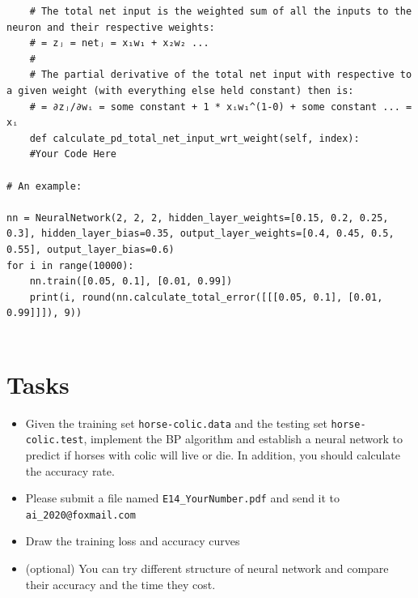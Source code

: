 \documentclass[a4paper, 11pt]{article}
\begin{document}
\begin{enumerate}
\begin{lstlisting}
    # The total net input is the weighted sum of all the inputs to the neuron and their respective weights:
    # = zⱼ = netⱼ = x₁w₁ + x₂w₂ ...
    #
    # The partial derivative of the total net input with respective to a given weight (with everything else held constant) then is:
    # = ∂zⱼ/∂wᵢ = some constant + 1 * xᵢw₁^(1-0) + some constant ... = xᵢ
    def calculate_pd_total_net_input_wrt_weight(self, index):
    #Your Code Here

# An example:

nn = NeuralNetwork(2, 2, 2, hidden_layer_weights=[0.15, 0.2, 0.25, 0.3], hidden_layer_bias=0.35, output_layer_weights=[0.4, 0.45, 0.5, 0.55], output_layer_bias=0.6)
for i in range(10000):
    nn.train([0.05, 0.1], [0.01, 0.99])
    print(i, round(nn.calculate_total_error([[[0.05, 0.1], [0.01, 0.99]]]), 9))


	\end{lstlisting}

\end{enumerate}
\section{Tasks}
\begin{itemize}
	\item Given the training set \texttt{horse-colic.data} and the testing set \texttt{horse-colic.test}, implement the BP algorithm and establish a neural network to predict if horses with colic will live or die. In addition, you should calculate the accuracy rate.
	\item Please submit a file named \texttt{E14\_YourNumber.pdf} and send it to \texttt{ai\_2020@foxmail.com}
	\item Draw the training loss and accuracy curves
	\item (optional) You can try different structure of neural network and compare their accuracy and the time they cost.
\end{itemize}
\end{document}
